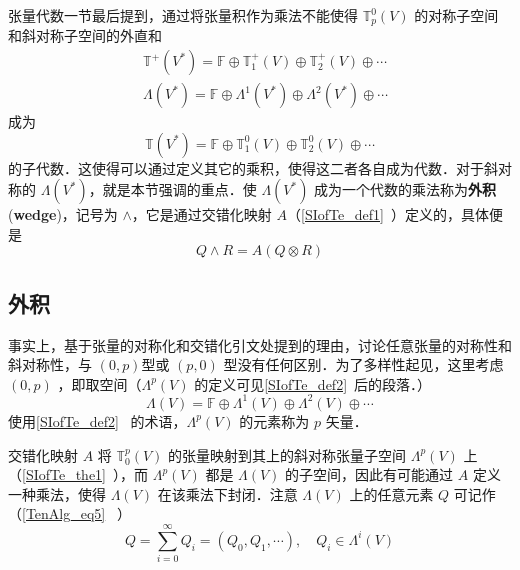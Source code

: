 
\begin{issues}
\issueMissDepend
{}
\end{issues}




张量代数一节最后提到，通过将张量积作为乘法不能使得 $\mathbb T_p^0(V)$ 的对称子空间和斜对称子空间的外直和 
\begin{equation}
\begin{aligned}
&\mathbb T^+(V^*)=\mathbb F\oplus\mathbb T_1^+(V)\oplus\mathbb T_2^+(V)\oplus\cdots\\
&\Lambda(V^*)=\mathbb F\oplus \Lambda^1(V^*)\oplus\Lambda^2(V^*)\oplus\cdots
\end{aligned}
\end{equation}
成为 
\begin{equation}
\mathbb T(V^*)=\mathbb F\oplus\mathbb T_1^0(V)\oplus\mathbb T_2^0(V)\oplus\cdots
\end{equation}
的子代数．这使得可以通过定义其它的乘积，使得这二者各自成为代数．对于斜对称的 $\Lambda(V^*)$，就是本节强调的重点．使 $\Lambda(V^*)$ 成为一个代数的乘法称为\textbf{外积}(\textbf{wedge})，记号为 $\wedge$，它是通过交错化映射 $A$（\autoref{SIofTe_def1}~）定义的，具体便是
\begin{equation}
Q\wedge R=A(Q\otimes R)
\end{equation}

\subsection{外积}
事实上，基于张量的对称化和交错化引文处提到的理由，讨论任意张量的对称性和斜对称性，与 $(0,p)$型或 $(p,0)$ 型没有任何区别．为了多样性起见，这里考虑 $(0,p)$ ，即取空间（$\Lambda^p(V)$ 的定义可见\autoref{SIofTe_def2}~后的段落．） 
\begin{equation}
\Lambda(V)=\mathbb F\oplus \Lambda^1(V)\oplus\Lambda^2(V)\oplus\cdots
\end{equation}
使用\autoref{SIofTe_def2}~ 的术语，$\Lambda^p(V)$ 的元素称为 $p$ 矢量．

交错化映射 $A$ 将 $\mathbb T_0^p(V)$ 的张量映射到其上的斜对称张量子空间 $\Lambda^p(V)$ 上（\autoref{SIofTe_the1}~），而 $\Lambda^p(V)$ 都是 $\Lambda(V)$ 的子空间，因此有可能通过 $A$ 定义一种乘法，使得 $\Lambda(V)$ 在该乘法下封闭．注意 $ \Lambda(V)$ 上的任意元素 $Q$ 可记作（\autoref{TenAlg_eq5}~ ）
\begin{equation}\label{ExtAlg_eq3}
Q=\sum_{i=0}^\infty Q_i=(Q_0,Q_1,\cdots),\quad Q_i\in\Lambda^i(V)
\end{equation}

